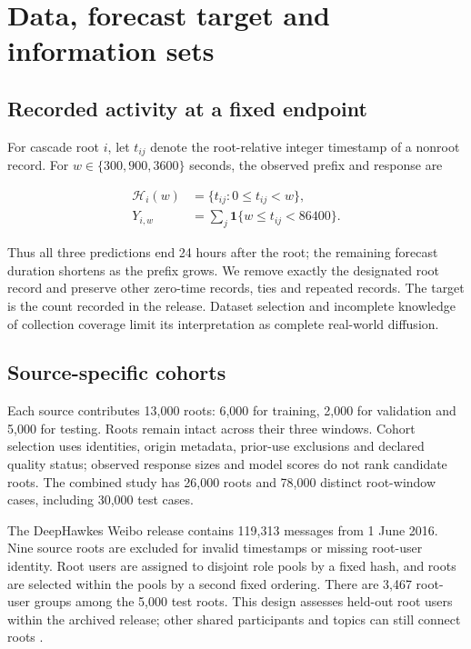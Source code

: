 \hypertarget{data-forecast-target-and-information-sets}{%
\section{Data, forecast target and information sets}}

\hypertarget{recorded-activity-at-a-fixed-endpoint}{%
\subsection{Recorded activity at a fixed endpoint}}

For cascade root \(i\), let \(t_{ij}\) denote the root-relative integer timestamp of a nonroot record. For \(w\in\{300,900,3600\}\) seconds, the observed prefix and response are

\begin{align}
\mathcal H_i(w)&=\{t_{ij}:0\le t_{ij}<w\},\\
Y_{i,w}&=\sum_j\mathbf1\{w\le t_{ij}<86400\}.
\end{align}

Thus all three predictions end 24 hours after the root; the remaining forecast duration shortens as the prefix grows. We remove exactly the designated root record and preserve other zero-time records, ties and repeated records. The target is the count recorded in the release. Dataset selection and incomplete knowledge of collection coverage limit its interpretation as complete real-world diffusion.

\hypertarget{source-specific-cohorts}{%
\subsection{Source-specific cohorts}}

Each source contributes 13,000 roots: 6,000 for training, 2,000 for validation and 5,000 for testing. Roots remain intact across their three windows. Cohort selection uses identities, origin metadata, prior-use exclusions and declared quality status; observed response sizes and model scores do not rank candidate roots. The combined study has 26,000 roots and 78,000 distinct root-window cases, including 30,000 test cases.

The DeepHawkes Weibo release contains 119,313 messages from 1 June 2016. Nine source roots are excluded for invalid timestamps or missing root-user identity. Root users are assigned to disjoint role pools by a fixed hash, and roots are selected within the pools by a second fixed ordering. There are 3,467 root-user groups among the 5,000 test roots. This design assesses held-out root users within the archived release; other shared participants and topics can still connect roots \cite{deephawkes2017}.

